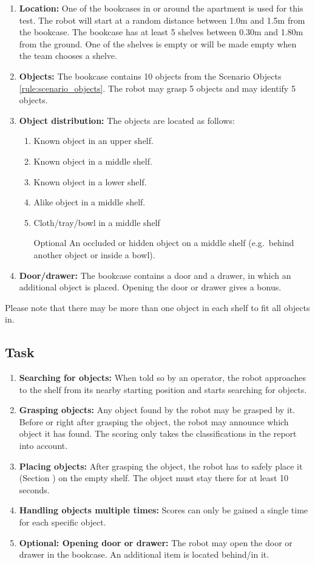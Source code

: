 \begin{enumerate}
\item \textbf{Location:} One of the bookcases in or around the apartment is used for this test. The robot will start at a random distance between 1.0m and 1.5m from the bookcase.
The bookcase has at least 5 shelves between 0.30m and 1.80m from the ground. One of the shelves is empty or will be made empty when the team chooses a shelve.
\item \textbf{Objects:} The bookcase contains 10 objects from the Scenario Objects \ref{rule:scenario_objects}.
  The robot may grasp 5 objects and may identify 5 objects.
\item \textbf{Object distribution:} The objects are located as follows:
\begin{enumerate}
\item Known object in an upper shelf.
\item Known object in a middle shelf.
\item Known object in a lower shelf.
\item Alike object in a middle shelf.
\item Cloth/tray/bowl in a middle shelf
\item[Optional] An occluded or hidden object on a middle shelf (e.g.~behind another object or inside a bowl).
\end{enumerate}
\item \textbf{Door/drawer:} The bookcase contains a door and a drawer, in which an additional object is placed. Opening the door or drawer gives a bonus. 
\end{enumerate}

Please note that there may be more than one object in each shelf to fit all objects in.

\subsection{Task}
\begin{enumerate}
\item \textbf{Searching for objects:} When told so by an operator, the robot approaches to the shelf from its nearby starting position and starts searching for objects.
\item \textbf{Grasping objects:} Any object found by the robot may be grasped by it. Before or right after grasping the object, the robot may announce which object it has found. The scoring only takes the classifications in the report into account. 
\item \textbf{Placing objects:} After grasping the object, the robot has to safely place it (Section ) on the empty shelf. 
  The object must stay there for at least 10 seconds.
\item \textbf{Handling objects multiple times:} Scores can only be gained a single time for each specific object.
\item \textbf{Optional: Opening door or drawer:} The robot may open the door or drawer in the bookcase. An additional item is located behind/in it. 
\end{enumerate}

